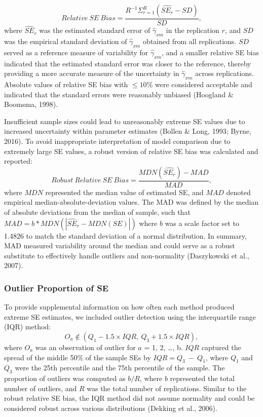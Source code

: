 \documentclass[
  man,mask]{apa6}
\begin{document}
\begin{equation}
Relative\ SE\ Bias = \frac{R^{-1}\Sigma^{R}_{r = 1}(\widehat{SE_{r}} - SD)}{SD},
\end{equation}
where \(\widehat{SE}_{r}\) was the estimated standard error of \(\hat{\gamma}_{xm}\) in the replication \(r\), and \(SD\) was the empirical standard deviation of \(\hat{\gamma}_{xm}\) obtained from all replications. \(SD\) served as a reference measure of variability for \(\hat{\gamma}_{xm}\), and a smaller relative SE bias indicated that the estimated standard error was closer to the reference, thereby providing a more accurate measure of the uncertainty in \(\hat{\gamma}_{xm}\) across replications. Absolute values of relative SE bias with \(\le 10\%\) were considered acceptable and indicated that the standard errors were reasonably unbiased (Hoogland \& Boomsma, 1998).

Insufficient sample sizes could lead to unreasonably extreme SE values due to increased uncertainty within parameter estimates (Bollen \& Long, 1993; Byrne, 2016). To avoid inappropriate interpretation of model comparison due to extremely large SE values, a robust version of relative SE bias was calculated and reported:
\begin{equation}
Robust\ Relative\ SE\ Bias = \frac{MDN(\widehat{SE_{r}}) - MAD}{MAD},
\end{equation}
where \(MDN\) represented the median value of estimated SE, and \(MAD\) denoted empirical median-absolute-deviation values. The MAD was defined by the median of absolute deviations from the median of sample, such that \(MAD = b*MDN(|\widehat{SE}_{r} - MDN(SE)|)\) where \(b\) was a scale factor set to 1.4826 to match the standard deviation of a normal distribution. In summary, MAD measured variability around the median and could serve as a robust substitute to effectively handle outliers and non-normality (Daszykowski et al., 2007).

\subsubsection{Outlier Proportion of SE}\label{outlier-proportion-of-se}

To provide supplemental information on how often each method produced extreme SE estimates, we included outlier detection using the interquartile range (IQR) method:
\begin{equation}
O_{a} \not\in (Q_{1} - 1.5 \times IQR, \ Q_{3} + 1.5 \times IQR),
\end{equation}
where \(O_{a}\) was an observation of outlier for \(a\) = 1, 2, \ldots, b. \(IQR\) captured the spread of the middle 50\(\%\) of the sample SEs by \(IQR = Q_{3} \ - \ Q_{1}\), where \(Q_{1}\) and \(Q_{3}\) were the 25th percentile and the 75th percentile of the sample. The proportion of outliers was computed as \(b/R\), where \(b\) represented the total number of outliers, and \(R\) was the total number of replications. Similar to the robust relative SE bias, the IQR method did not assume normality and could be considered robust across various distributions (Dekking et al., 2006).
\end{document}
